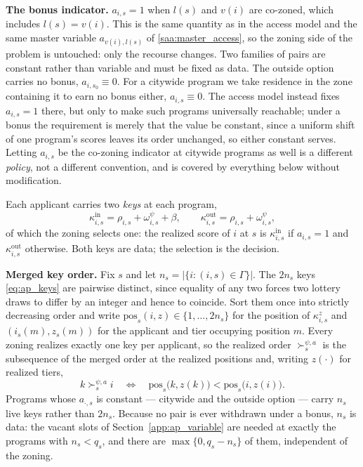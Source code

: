 \documentclass{article}
\begin{document}
\noindent\textbf{The bonus indicator.} $a_{i,s} = 1$ when $l(s)$ and $v(i)$ are co-zoned, which includes $l(s) = v(i)$. This is the same quantity as in the access model and the same master variable $a_{v(i), l(s)}$ of \eqref{saa:master_access}, so the zoning side of the problem is untouched: only the recourse changes. Two families of pairs are constant rather than variable and must be fixed as data. The outside option carries no bonus, $a_{i,s_0} \equiv 0$. For a citywide program we take residence in the zone containing it to earn no bonus either, $a_{i,s} \equiv 0$. The access model instead fixes $a_{i,s} = 1$ there, but only to make such programs universally reachable; under a bonus the requirement is merely that the value be constant, since a uniform shift of one program's scores leaves its order unchanged, so either constant serves. Letting $a_{i,s}$ be the co-zoning indicator at citywide programs as well is a different \emph{policy}, not a different convention, and is covered by everything below without modification.

Each applicant carries two \emph{keys} at each program,
\begin{equation}\label{eq:ap_keys}
\kappa^{\mathrm{in}}_{i,s} = \rho_{i,s} + \omega_{i,s}^\psi + \beta,
\qquad
\kappa^{\mathrm{out}}_{i,s} = \rho_{i,s} + \omega_{i,s}^\psi ,
\end{equation}
of which the zoning selects one: the realized score of $i$ at $s$ is $\kappa^{\mathrm{in}}_{i,s}$ if $a_{i,s} = 1$ and $\kappa^{\mathrm{out}}_{i,s}$ otherwise. Both keys are data; the selection is the decision.

\noindent\textbf{Merged key order.} Fix $s$ and let $n_s = |\{i : (i,s) \in \Gamma\}|$. The $2 n_s$ keys \eqref{eq:ap_keys} are pairwise distinct, since equality of any two forces two lottery draws to differ by an integer and hence to coincide. Sort them once into strictly decreasing order and write $\mathrm{pos}_s(i,z) \in \{1, \dots, 2 n_s\}$ for the position of $\kappa^{z}_{i,s}$ and $(i_s(m), z_s(m))$ for the applicant and tier occupying position $m$. Every zoning realizes exactly one key per applicant, so the realized order $\succ_s^{\psi,a}$ is the subsequence of the merged order at the realized positions and, writing $z(\cdot)$ for realized tiers,
\begin{equation}\label{eq:ap_pos_order}
k \succ_s^{\psi,a} i
\quad\Longleftrightarrow\quad
\mathrm{pos}_s\big(k, z(k)\big) < \mathrm{pos}_s\big(i, z(i)\big).
\end{equation}
Programs whose $a_{\cdot,s}$ is constant --- citywide and the outside option --- carry $n_s$ live keys rather than $2 n_s$. Because no pair is ever withdrawn under a bonus, $n_s$ is data: the vacant slots of Section~\ref{app:ap_variable} are needed at exactly the programs with $n_s < q_s$, and there are $\max\{0, q_s - n_s\}$ of them, independent of the zoning.
\end{document}
